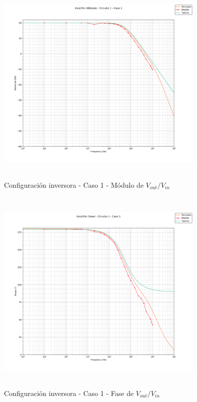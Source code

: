 \begin{figure}[H] %
	\centering
	\includegraphics[width=10cm,height=10cm,keepaspectratio]{../EJ1/00GRAFICOS/c1c1/c1c1voviMod.png}
	\caption{Configuración inversora -  Caso 1 - Módulo de $V_{out}/V_{in}$}
	\label{c1c1voviM}
\end{figure}

\begin{figure}[H] %
	\centering
	\includegraphics[width=10cm,height=10cm,keepaspectratio]{../EJ1/00GRAFICOS/c1c1/c1c1voviFASE.png}
	\caption{Configuración inversora - Caso 1 - Fase de $V_{out}/V_{in}$}
	\label{c1c1voviP}
\end{figure}

